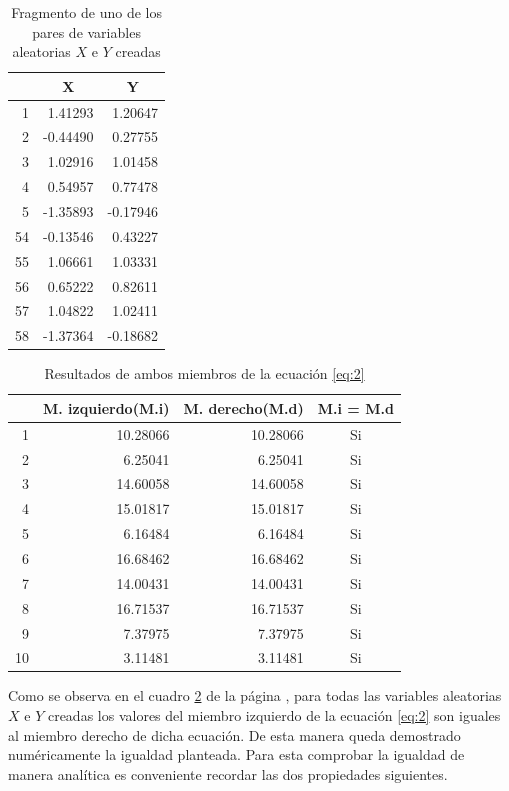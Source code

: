 \documentclass{article}
\begin{document}
\begin{table}[H]
  \centering
  \caption{Fragmento de uno de los pares de variables aleatorias $X$ e $Y$ creadas}
    \begin{tabular}{rrr}
    \toprule
          & \multicolumn{1}{c}{X} & \multicolumn{1}{c}{Y} \\
    \midrule
    1     & 1.41293 & 1.20647 \\
    2     & -0.44490 & 0.27755 \\
    3     & 1.02916 & 1.01458 \\
    4     & 0.54957 & 0.77478 \\
    5     & -1.35893 & -0.17946 \\
    54    & -0.13546 & 0.43227 \\
    55    & 1.06661 & 1.03331 \\
    56    & 0.65222 & 0.82611 \\
    57    & 1.04822 & 1.02411 \\
    58    & -1.37364 & -0.18682 \\
    \bottomrule
    \end{tabular}%
  \label{tab:1}%
\end{table}%
\begin{table}[H]
  \centering
  \caption{Resultados de ambos miembros de la ecuación \ref{eq:2}}
    \begin{tabular}{rrrc}
    \toprule
          & \multicolumn{1}{l}{M. izquierdo(M.i)} & \multicolumn{1}{l}{M. derecho(M.d)} & \multicolumn{1}{l}{M.i  =  M.d} \\
    \midrule
    1     & 10.28066 & 10.28066 & Si \\
    2     & 6.25041 & 6.25041 & Si \\
    3     & 14.60058 & 14.60058 & Si \\
    4     & 15.01817 & 15.01817 & Si \\
    5     & 6.16484 & 6.16484 & Si \\
    6     & 16.68462 & 16.68462 & Si \\
    7     & 14.00431 & 14.00431 & Si \\
    8     & 16.71537 & 16.71537 & Si \\
    9     & 7.37975 & 7.37975 & Si \\
    10    & 3.11481 & 3.11481 & Si \\
    \bottomrule
    \end{tabular}%
  \label{tab:2}%
\end{table}%
Como se observa en el cuadro \ref{tab:2} de la página \pageref{tab:2}, para todas las variables aleatorias $X$ e $Y$ creadas los valores del miembro izquierdo de la ecuación \ref{eq:2} son iguales al miembro derecho de dicha ecuación. De esta manera queda demostrado numéricamente la igualdad planteada. Para esta comprobar la igualdad de manera analítica es conveniente recordar las dos propiedades siguientes.
\end{document}
